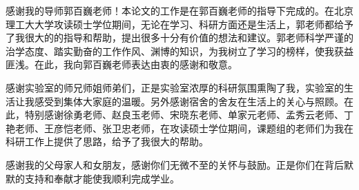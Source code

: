 

\begin{thanks}

感谢我的导师郭百巍老师！本论文的工作是在郭百巍老师的指导下完成的。在北京理工大大学攻读硕士学位期间，无论在学习、科研方面还是生活上，郭老师都给予了我很大的的指导和帮助，提出很多十分有价值的想法和建议。郭老师科学严谨的治学态度、踏实勤奋的工作作风、渊博的知识，为我树立了学习的榜样，使我获益匪浅。在此，我向郭百巍老师表达由衷的感谢和敬意。

感谢实验室的师兄师姐师弟们，正是实验室浓厚的科研氛围熏陶了我，实验室的生活让我感受到集体大家庭的温暖。另外感谢宿舍的舍友在生活上的关心与照顾。在此，特别感谢徐勇老师、赵良玉老师、宋晓东老师、单家元老师、孟秀云老师、丁艳老师、王彦恺老师、张卫忠老师，在攻读硕士学位期间，课题组的老师们为我在科研工作上提供了思路，给予了我很大的帮助。

感谢我的父母家人和女朋友，感谢你们无微不至的关怀与鼓励。正是你们在背后默默的支持和奉献才能使我顺利完成学业。


\end{thanks}
